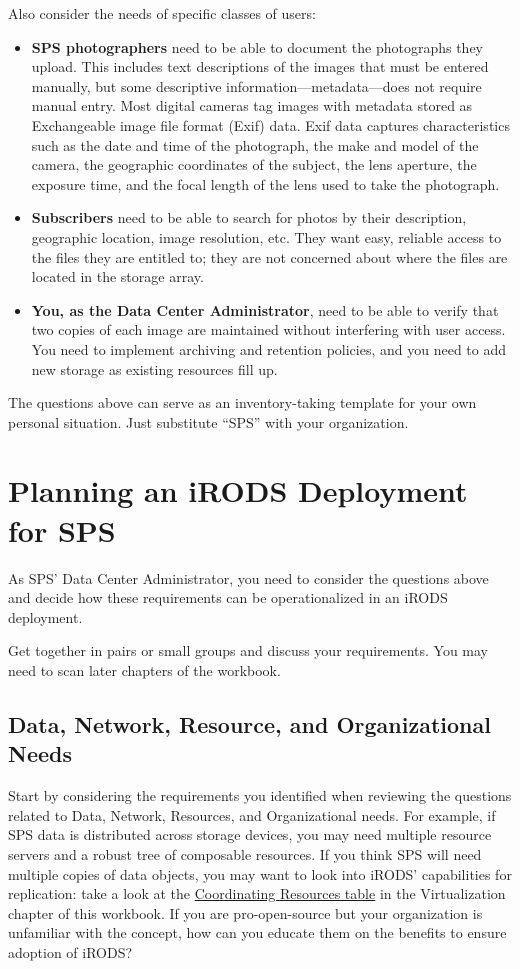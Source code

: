 \documentclass[10pt,oneside]{memoir}
\begin{document}
Also consider the needs of specific classes of users:
\begin{itemize}
 \item \textbf{SPS photographers} need to be able to document the photographs they upload. This includes text descriptions of the images that must be entered manually, but some descriptive information---metadata---does not require manual entry. Most digital cameras tag images with metadata stored as Exchangeable image file format (Exif) data. Exif data captures characteristics such as the date and time of the photograph, the make and model of the camera, the geographic coordinates of the subject, the lens aperture, the exposure time, and the focal length of the lens used to take the photograph.
 \item \textbf{Subscribers} need to be able to search for photos by their description, geographic location, image resolution, etc. They want easy, reliable access to the files they are entitled to; they are not concerned about where the files are located in the storage array.
 \item \textbf{You, as the Data Center Administrator}, need to be able to verify that two copies of each image are maintained without interfering with user access. You need to implement archiving and retention policies, and you need to add new storage as existing resources fill up.
\end{itemize}

The questions above can serve as an inventory-taking template for your own personal situation. Just substitute “SPS” with your organization.

\section{Planning an iRODS Deployment for SPS}

As SPS' Data Center Administrator, you need to consider the questions above and decide how these requirements can be operationalized in an iRODS deployment.

Get together in pairs or small groups and discuss your requirements. You may need to scan later chapters of the workbook.

\subsection{Data, Network, Resource, and Organizational Needs}

Start by considering the requirements you identified when reviewing the questions related to Data, Network, Resources, and Organizational needs. For example, if SPS data is distributed across storage devices, you may need multiple resource servers and a robust tree of composable resources. If you think SPS will need multiple copies of data objects, you may want to look into iRODS' capabilities for replication: take a look at the \hyperref[sec:coordinating_resources]{Coordinating Resources table} in the Virtualization chapter of this workbook. If you are pro-open-source but your organization is unfamiliar with the concept, how can you educate them on the benefits to ensure adoption of iRODS?
\end{document}
